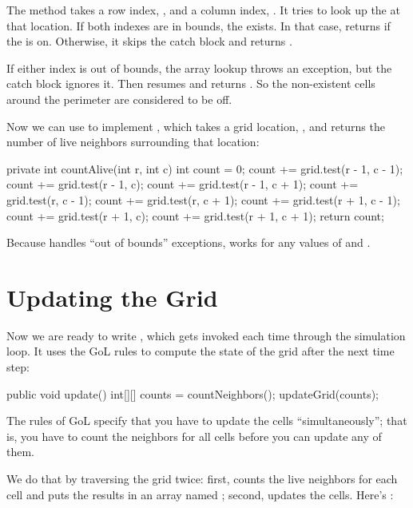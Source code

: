 The  method takes a row index, , and a column index, .
It tries to look up the  at that location.
If both indexes are in bounds, the  exists.
In that case,  returns  if the  is on.
Otherwise, it skips the catch block and returns .

If either index is out of bounds, the array lookup throws an exception, but the catch block ignores it.
Then  resumes and returns .
So the non-existent cells around the perimeter are considered to be off.

Now we can use  to implement , which takes a grid location, , and returns the number of live neighbors surrounding that location:

\begin{code}
private int countAlive(int r, int c) {
    int count = 0;
    count += grid.test(r - 1, c - 1);
    count += grid.test(r - 1, c);
    count += grid.test(r - 1, c + 1);
    count += grid.test(r, c - 1);
    count += grid.test(r, c + 1);
    count += grid.test(r + 1, c - 1);
    count += grid.test(r + 1, c);
    count += grid.test(r + 1, c + 1);
    return count;
}
\end{code}

Because  handles ``out of bounds'' exceptions,  works for any values of  and .


\section{Updating the Grid}
\label{sec:update}

Now we are ready to write , which gets invoked each time through the simulation loop.
It uses the GoL rules to compute the state of the grid after the next time step:

\begin{code}
public void update() {
    int[][] counts = countNeighbors();
    updateGrid(counts);
}
\end{code}

The rules of GoL specify that you have to update the cells ``simultaneously''; that is, you have to count the neighbors for all cells before you can update any of them.

We do that by traversing the grid twice: first,  counts the live neighbors for each cell and puts the results in an array named ; second,  updates the cells.
Here's :

